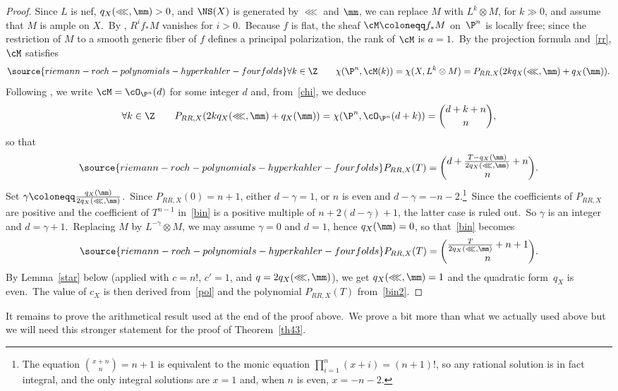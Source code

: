 \begin{proof}
Since $L$ is nef, $q_X(\lll,\mm)>0$, and $\NS(X)$ is generated by $\lll$ and $\mm$, we can replace $M$ with $L^k\otimes M$, for $k\gg0$, and assume that $M$ is ample on $X$.\  By \cite[Theorem~10.32]{kol}, $R^if_*M$ vanishes for $i>0$.\ Because $f$ is flat,     the sheaf $\cM\coloneqq f_*M$ on~$\P^n$ is locally free; since
the restriction of $M$ to a smooth generic fiber of $f$ defines a principal polarization, the rank of $\cM$ is  $a=1$.\
By the projection formula and~\eqref{rr}, $\cM$ satisfies
\begin{equation}\label{chi}
\source{riemann-roch-polynomials-hyperkahler-fourfolds}
\forall k\in\Z\qquad\chi(\P^n, \cM(k))=\chi(X,  L^k\otimes M) =P_{RR,X}(2kq_X(\lll,\mm)+q_X(\mm)) .
\end{equation}
Following \cite[Section~3]{ort}, we write $\cM=\cO_{\P^n}(d)$ for some integer $d$ and, from~\eqref{chi}, we deduce
\[
\forall k\in\Z\qquad P_{RR,X}(2kq_X(\lll,\mm)+q_X(\mm))=\chi(\P^n,\cO_{\P^n}(d+k))=\binom{d+k+n}{n},
\]
so that
\begin{equation}\label{bin}
\source{riemann-roch-polynomials-hyperkahler-fourfolds}
P_{RR,X}(T)= \binom{d+\frac{T-q_X(\mm)}{2 q_X(\lll,\mm)}+n}{n}.
\end{equation}
Set $\gamma\coloneqq \frac{ q_X(\mm)}{2 q_X(\lll,\mm)} $.\ Since $P_{RR,X}(0)=n+1$, either $d-\gamma=1$, or $n$ is even and $d-\gamma=-n-2$.\footnote{The equation $\binom{x+n}{n}= n+1$ is equivalent to the monic equation $\prod_{i=1}^n(x+i)= (n+1)! $, so any rational solution is in fact integral, and the only integral solutions are $x=1$ and, when $n$ is even, $x=-n-2 $.}\
Since the coefficients of $P_{RR,X}$ are positive and the coefficient of $T^{n-1}$ in~\eqref{bin} is a positive multiple of $ n+2(d-\gamma) +1$, the latter case is ruled out.\
So $\gamma$ is an integer and $d=\gamma+1$.\ Replacing $M$ by $L^{-\gamma}\otimes M$, we may  assume $\gamma=0$ and $d=1$, hence $q_X(\mm)=0$, so that~\eqref{bin} becomes
\begin{equation}\label{bin2}
\source{riemann-roch-polynomials-hyperkahler-fourfolds}
P_{RR,X}(T)= \binom{\frac{T}{2 q_X(\lll,\mm)}+n+1}{n}.
\end{equation}
By  Lemma~\ref{star} below (applied with $c=n!$, $c'=1$, and $q=2 q_X(\lll,\mm)$), we get    $q_X(\lll,\mm)=1$ and the quadratic form~$q_X$ is even.\
The value of $c_X$ is then derived from~\eqref{pol} and the polynomial $P_{RR,X}(T)$ from~\eqref{bin2}.
\end{proof}

It remains to prove the arithmetical result   used at the end of the proof above.\ We prove a bit more  than what we actually used above but we will need this stronger statement for the proof of Theorem~\ref{th43}.


